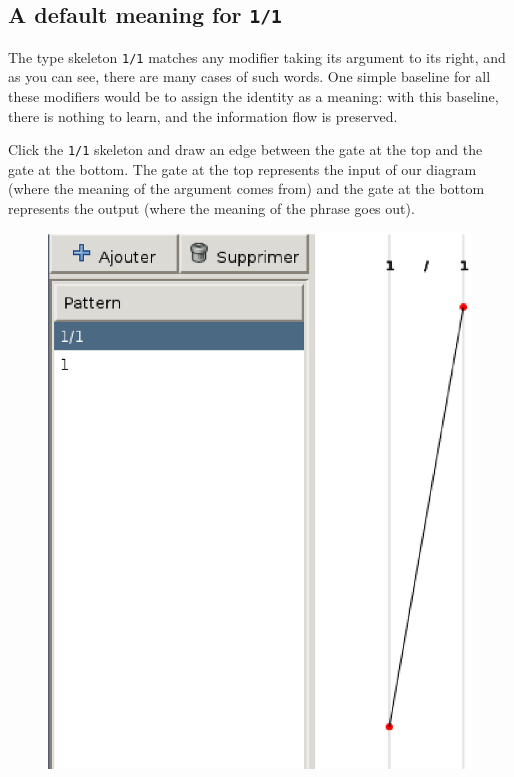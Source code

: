 \documentclass[a4paper]{article}
\begin{document}
\subsection{A default meaning for \texttt{1/1}}

The type skeleton \texttt{1/1} matches any modifier taking its argument to its right,
and as you can see, there are many cases of such words. One simple baseline for all
these modifiers would be to assign the identity as a meaning: with this baseline,
there is nothing to learn, and the information flow is preserved.

Click the \texttt{1/1} skeleton and draw an edge between the gate at the top and
the gate at the bottom. The gate at the top represents the input of our diagram
(where the meaning of the argument comes from) and the gate at the bottom represents
the output (where the meaning of the phrase goes out).

\begin{figure}[H]
\centering
\includegraphics[scale=0.35]{figures/identity.eps}
\end{figure}
\end{document}
